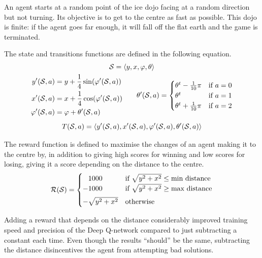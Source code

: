 An agent starts at a random point of the ice dojo facing at a random direction but not turning.
Its objective is to get to the centre as fast as possible.
This dojo is finite: if the agent goes far enough, it will fall off the flat earth and the game is terminated.

The state and transitions functions are defined in the following equation.
\newcommand{\statet}{\left< y, x, \varphi, \theta \right>}
\begin{gather*}
	\state = \statet \\
	\begin{aligned}
		y'(\state, a) &= y + \frac{1}{4} \sin(\varphi'(\state, a)) \\
		x'(\state, a) &= x + \frac{1}{4} \cos(\varphi'(\state, a)) \\
		\varphi'(\state, a) &= \varphi + \theta'(\state, a)
	\end{aligned}
	\qquad
	\theta'(\state, a)= \begin{cases}
		\theta^t - \frac{1}{10} \pi & \text{if } a = 0 \\
		\theta^t & \text{if } a = 1 \\
		\theta^t + \frac{1}{10} \pi & \text{if } a = 2
	\end{cases} \\[1ex]
	T(\state, a) = \left< y'(\state, a), x'(\state, a), \varphi'(\state, a), \theta'(\state, a) \right>
\end{gather*}

The reward function is defined to maximise the changes of an agent making it to the centre by, in addition to giving high scores for winning and low scores for losing, giving it a score depending on the distance to the centre.
\begin{equation*}
	\mathcal{R}(\mathcal{S}) = \begin{cases}
		\phantom{+}1000 & \text{if } \sqrt{y^2 + x^2} \leq \text{min distance} \\
		-1000 & \text{if } \sqrt{y^2 + x^2} \geq \text{max distance} \\[1ex]
		-\sqrt{y^2 + x^2} & \text{otherwise}
	\end{cases}
\end{equation*}

Adding a reward that depends on the distance considerably improved training speed and precision of the Deep Q-network compared to just subtracting a constant each time.
Even though the results ``should'' be the same, subtracting the distance disincentives the agent from attempting bad solutions.

